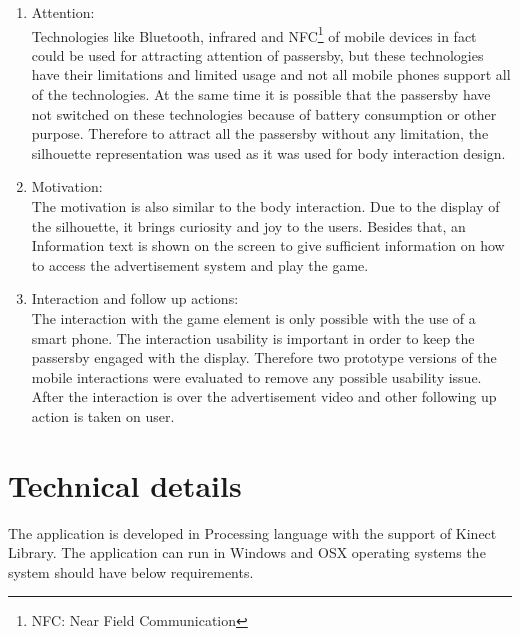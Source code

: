 \begin{enumerate}

\item Attention: \\
Technologies like Bluetooth, infrared and NFC\footnote{NFC: Near Field Communication} of mobile devices in fact could be used for attracting attention of passersby, but these technologies have their limitations and limited usage and not all mobile phones support all of the technologies. At the same time it is possible that the passersby have not switched on these technologies because of battery consumption or other purpose. Therefore to attract all the passersby without any limitation, the silhouette representation was used as it was used for body interaction design.

\item Motivation: \\
The motivation is also similar to the body interaction. Due to the display of the silhouette, it brings curiosity and joy to the users. Besides that, an Information text is shown on the screen to give sufficient information on how to access the advertisement system and play the game.

\item Interaction and follow up actions: \\
The interaction with the game element is only possible with the use of a smart phone. The interaction usability is important in order to keep the passersby engaged with the display. Therefore two prototype versions of the mobile interactions were evaluated to remove any possible usability issue. After the interaction is over the advertisement video and other following up action is taken on user.


\end{enumerate}



\section{Technical details}
The application is developed in Processing language with the support of Kinect Library. The application can run in Windows and OSX operating systems the system should have below requirements.


